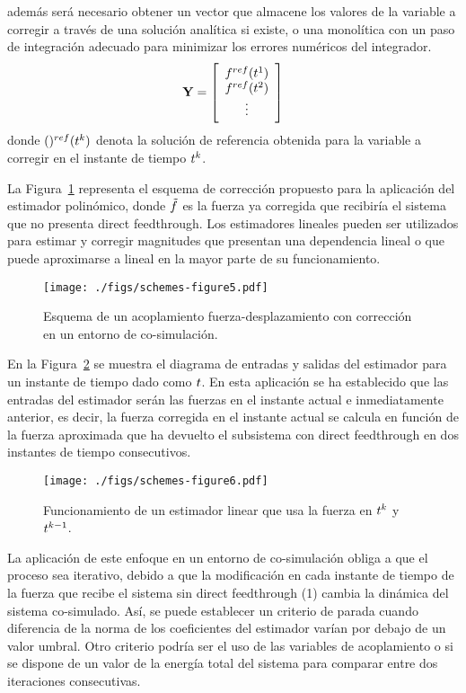 además será necesario obtener un vector que almacene los valores de la variable a corregir a través de una solución analítica si existe, o una monolítica con un paso de integración adecuado para minimizar los errores numéricos del integrador.
%
\begin{equation}
    \estimated = \sqbr{\matr{c}
    {\forceMod^{ref} (t^1) \\ \forceMod^{ref} (t^2) \\ \vdots}} 
\end{equation}
%
donde $()^{ref} (\ctime^k)$ denota la solución de referencia obtenida para la variable a corregir en el instante de tiempo $\ctime^k$.

La Figura~\ref{fig:FScorr} representa el esquema de corrección propuesto para la aplicación del estimador polinómico, donde $\forceCorr$ es la fuerza ya corregida que recibiría el sistema que no presenta direct feedthrough. 
Los estimadores lineales pueden ser utilizados para estimar y corregir magnitudes que presentan una dependencia lineal o que puede aproximarse a lineal en la mayor parte de su funcionamiento.

\begin{figure}[ht!]\centering
	\texttt{[image: ./figs/schemes-figure5.pdf]}
	\caption{Esquema de un acoplamiento fuerza-desplazamiento con corrección en un entorno de co-simulación.}
	\label{fig:FScorr}
\end{figure}

En la Figura~\ref{fig:Estimador} se muestra el diagrama de entradas y salidas del estimador para un instante de tiempo dado como $\ctime$. 
En esta aplicación se ha establecido que las entradas del estimador serán las fuerzas en el instante actual e inmediatamente anterior, es decir, la fuerza corregida en el instante actual se calcula en función de la fuerza aproximada que ha devuelto el subsistema con direct feedthrough en dos instantes de tiempo consecutivos.

\begin{figure}[ht!]\centering
	\texttt{[image: ./figs/schemes-figure6.pdf]}
	\caption{Funcionamiento de un estimador linear que usa la fuerza en $\ctime^{\step}$ y $\ctime^{\step - 1}$.}
	\label{fig:Estimador}
\end{figure}

La aplicación de este enfoque en un entorno de co-simulación obliga a que el proceso sea iterativo, debido a que la modificación en cada instante de tiempo de la fuerza que recibe el sistema sin direct feedthrough (1) cambia la dinámica del sistema co-simulado.
Así, se puede establecer un criterio de parada cuando diferencia de la norma de los coeficientes del estimador varían por debajo de un valor umbral. Otro criterio podría ser el uso de las variables de acoplamiento o si se dispone de un valor de la energía total del sistema para comparar entre dos iteraciones consecutivas.

